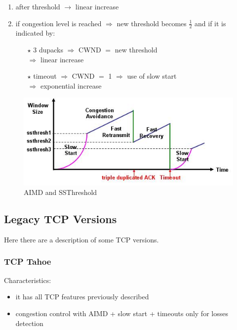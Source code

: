 \begin{itemize}
\begin{itemize}
\begin{itemize}
\begin{itemize}
\begin{enumerate}
                    \item after threshold $\rightarrow$ linear increase
                    \item if congestion level is reached $\Rightarrow$ new threshold becomes $\frac{1}{2}$ and if it is indicated by:
                    \begin{enumerate}
                        \item[$\star$] 3 dupacks $\Rightarrow$ CWND $=$ new threshold\\$\Rightarrow$ linear increase
                        \item[$\star$] timeout $\Rightarrow$ CWND $=$ 1 $\Rightarrow$ use of slow start\\$\Rightarrow$ exponential increase
                    \end{enumerate} 
                \end{enumerate}
            \end{itemize}
        \end{itemize}
    \end{itemize}
\end{itemize}
\begin{figure}[!h] 
    \centering 
    \includegraphics[scale = 0.55]{images/ssthreshold.jpg} 
    \caption{AIMD and SSThreshold}
    \label{aimd-ssthreshold}
\end{figure}
\subsection{Legacy TCP Versions}
Here there are a description of some TCP versions.
\subsubsection{TCP Tahoe}
Characteristics:
\begin{itemize}
    \item it has all TCP features previously described
    \item congestion control with AIMD + slow start + timeouts only for losses detection
\end{itemize}
